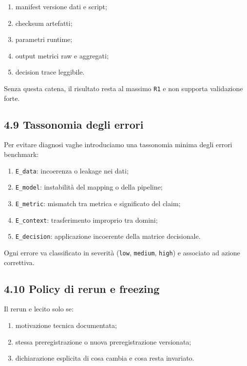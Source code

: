 \begin{enumerate}
\def\labelenumi{\arabic{enumi}.}
\tightlist
\item
  manifest versione dati e script;
\item
  checksum artefatti;
\item
  parametri runtime;
\item
  output metrici raw e aggregati;
\item
  decision trace leggibile.
\end{enumerate}

Senza questa catena, il risultato resta al massimo \texttt{R1} e non supporta validazione forte.

\subsection{4.9 Tassonomia degli errori}

Per evitare diagnosi vaghe introduciamo una tassonomia minima degli errori benchmark:

\begin{enumerate}
\def\labelenumi{\arabic{enumi}.}
\tightlist
\item
  \texttt{E\_data}: incoerenza o leakage nei dati;
\item
  \texttt{E\_model}: instabilità del mapping o della pipeline;
\item
  \texttt{E\_metric}: mismatch tra metrica e significato del claim;
\item
  \texttt{E\_context}: trasferimento improprio tra domini;
\item
  \texttt{E\_decision}: applicazione incoerente della matrice decisionale.
\end{enumerate}

Ogni errore va classificato in severità (\texttt{low}, \texttt{medium}, \texttt{high}) e associato ad azione correttiva.

\subsection{4.10 Policy di rerun e freezing}

Il rerun e lecito solo se:

\begin{enumerate}
\def\labelenumi{\arabic{enumi}.}
\tightlist
\item
  motivazione tecnica documentata;
\item
  stessa preregistrazione o nuova preregistrazione versionata;
\item
  dichiarazione esplicita di cosa cambia e cosa resta invariato.
\end{enumerate}

